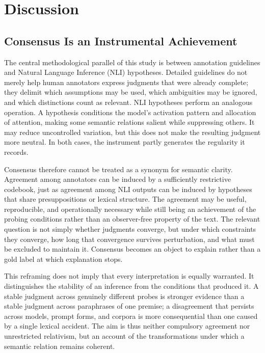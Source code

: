 \section{Discussion}

\subsection{Consensus Is an Instrumental Achievement}

The central methodological parallel of this study is between annotation guidelines and Natural Language Inference (NLI) hypotheses. Detailed guidelines do not merely help human annotators express judgments that were already complete; they delimit which assumptions may be used, which ambiguities may be ignored, and which distinctions count as relevant. NLI hypotheses perform an analogous operation. A hypothesis conditions the model's activation pattern and allocation of attention, making some semantic relations salient while suppressing others. It may reduce uncontrolled variation, but this does not make the resulting judgment more neutral. In both cases, the instrument partly generates the regularity it records.

Consensus therefore cannot be treated as a synonym for semantic clarity. Agreement among annotators can be induced by a sufficiently restrictive codebook, just as agreement among NLI outputs can be induced by hypotheses that share presuppositions or lexical structure. The agreement may be useful, reproducible, and operationally necessary while still being an achievement of the probing conditions rather than an observer-free property of the text. The relevant question is not simply whether judgments converge, but under which constraints they converge, how long that convergence survives perturbation, and what must be excluded to maintain it. Consensus becomes an object to explain rather than a gold label at which explanation stops.

This reframing does not imply that every interpretation is equally warranted. It distinguishes the stability of an inference from the conditions that produced it. A stable judgment across genuinely different probes is stronger evidence than a stable judgment across paraphrases of one premise; a disagreement that persists across models, prompt forms, and corpora is more consequential than one caused by a single lexical accident. The aim is thus neither compulsory agreement nor unrestricted relativism, but an account of the transformations under which a semantic relation remains coherent.

